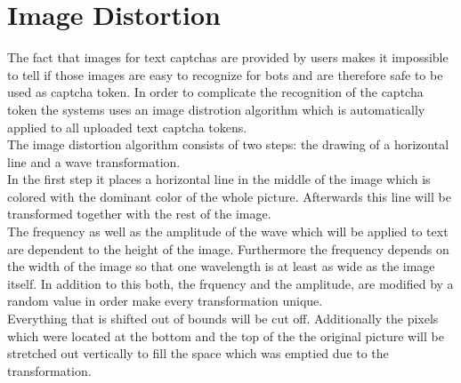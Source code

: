 \section{Image Distortion}
\label{sec:image_distortion}

The fact that images for text captchas are provided by users makes it impossible to tell if those images are easy to recognize for bots and are therefore safe to be used as captcha token. In order to complicate the recognition of the captcha token the systems uses an image distrotion algorithm which is automatically applied to all uploaded text captcha tokens.\\
The image distortion algorithm consists of two steps: the drawing of a horizontal line and a wave transformation. \\
In the first step it places a horizontal line in the middle of the image which is colored with the dominant color of the whole picture. Afterwards this line will be transformed together with the rest of the image.\\
The frequency as well as the amplitude of the wave which will be applied to text are dependent to the height of the image. Furthermore the frequency depends on the width of the image so that one wavelength is at least as wide as the image itself. In addition to this both, the frquency and the amplitude, are modified by a random value in order make every transformation unique. \\
Everything that is shifted out of bounds will be cut off. Additionally the pixels which were located at the bottom and the top of the the original picture will be stretched out vertically to fill the space which was emptied due to the transformation.\\
